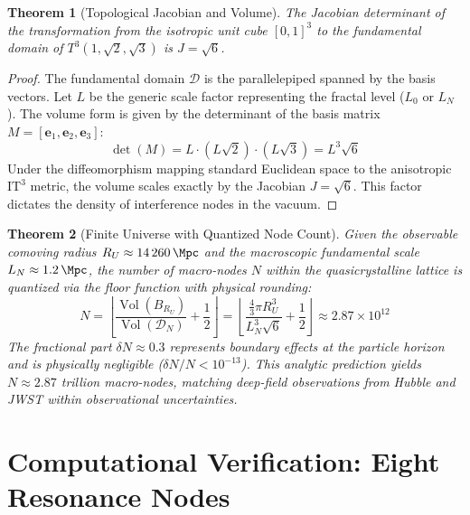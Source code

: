 \documentclass[12pt,a4paper,oneside]{article}
\theoremstyle{plain}
\newtheorem{theorem}{Theorem}[section]
\theoremstyle{definition}
\theoremstyle{remark}
\newcommand{\ITthree}{\mathrm{IT}^3}
\newcommand{\Tthree}{T^3(1,\sqrt{2},\sqrt{3})}
\DeclareMathOperator{\Vol}{Vol}
\begin{document}
\begin{theorem}[Topological Jacobian and Volume]
\label{thm:jacobian}
The Jacobian determinant of the transformation from the isotropic unit cube $[0,1]^3$ to the fundamental domain of \texorpdfstring{$\Tthree$}{T3} is $J = \sqrt{6}$.
\end{theorem}

\begin{proof}
The fundamental domain $\mathcal{D}$ is the parallelepiped spanned by the basis vectors. Let $L$ be the generic scale factor representing the fractal level ($L_0$ or $L_N$). The volume form is given by the determinant of the basis matrix $M = [\mathbf{e}_1, \mathbf{e}_2, \mathbf{e}_3]$:
\begin{equation}
\det(M) = L \cdot (L\sqrt{2}) \cdot (L\sqrt{3}) = L^3\sqrt{6}
\end{equation}
Under the diffeomorphism mapping standard Euclidean space to the anisotropic \texorpdfstring{$\ITthree$}{IT3} metric, the volume scales exactly by the Jacobian $J = \sqrt{6}$. This factor dictates the density of interference nodes in the vacuum.
\end{proof}

\begin{theorem}[Finite Universe with Quantized Node Count]
\label{thm:finite}
Given the observable comoving radius $R_U \approx \SI{14260}{\Mpc}$ and the macroscopic fundamental scale $L_N \approx \SI{1.2}{\Mpc}$, the number of macro-nodes $N$ within the quasicrystalline lattice is quantized via the floor function with physical rounding:
\begin{equation}
N = \left\lfloor \frac{\Vol(B_{R_U})}{\Vol(\mathcal{D}_N)} + \frac{1}{2} \right\rfloor = \left\lfloor \frac{\frac{4}{3}\pi R_U^3}{L_N^3 \sqrt{6}} + \frac{1}{2} \right\rfloor \approx 2.87 \times 10^{12}
\end{equation}
The fractional part $\delta N \approx 0.3$ represents boundary effects at the particle horizon and is physically negligible ($\delta N / N < 10^{-13}$). This analytic prediction yields $N \approx 2.87$ trillion macro-nodes, matching deep-field observations from Hubble and JWST within observational uncertainties.
\end{theorem}

\section{Computational Verification: Eight Resonance Nodes}
\label{sec:nodes}
\end{document}
